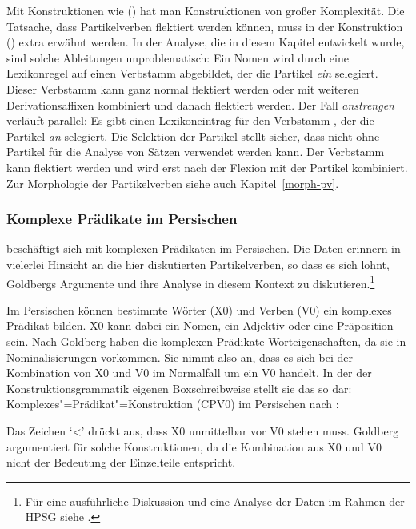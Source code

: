 Mit Konstruktionen wie () hat man Konstruktionen von großer Komplexität.
Die Tatsache, dass Partikelverben flektiert werden können, muss in der Konstruktion
() extra erwähnt werden. In der Analyse, die in diesem Kapitel entwickelt
wurde, sind solche Ableitungen unproblematisch: Ein Nomen wird durch eine
Lexikonregel auf einen Verbstamm abgebildet, der die Partikel \emph{ein} selegiert.
Dieser Verbstamm kann ganz normal flektiert werden oder mit weiteren Derivationsaffixen
kombiniert und danach flektiert werden. Der Fall \emph{anstrengen} verläuft parallel:
Es gibt einen Lexikoneintrag für den Verbstamm , der die Partikel \emph{an}
selegiert. Die Selektion der Partikel stellt sicher, dass  nicht ohne Partikel für die
Analyse von Sätzen verwendet werden kann. Der Verbstamm kann flektiert werden
und wird erst nach der Flexion mit der Partikel kombiniert.
Zur Morphologie der Partikelverben siehe auch Kapitel~\ref{morph-pv}.
%
%
%


\subsubsection{Komplexe Prädikate im Persischen}
\label{sec-cp-persisch}

\citet{Goldberg2003a} beschäftigt sich mit komplexen Prädikaten im Persischen.
Die Daten erinnern in vielerlei Hinsicht an die hier diskutierten Partikelverben, so dass
es sich lohnt, Goldbergs Argumente und ihre Analyse in diesem Kontext zu diskutieren.\footnote{
  Für eine ausführliche Diskussion und eine Analyse der Daten im Rahmen der HPSG siehe .
}

Im Persischen können bestimmte Wörter (X0) und Verben (V0) ein komplexes Prädikat bilden.
X0 kann dabei ein Nomen, ein Adjektiv oder eine Präposition sein. Nach Goldberg haben die
komplexen Prädikate Worteigenschaften, da sie in Nominalisierungen vorkommen. Sie nimmt also an,
dass es sich bei der Kombination von X0 und V0 im Normalfall um ein V0 handelt. In der
der Konstruktionsgrammatik eigenen Boxschreibweise stellt sie das so dar:
\eas
Komplexes"=Prädikat"=Konstruktion (CPV0) im Persischen nach :\\
\zs
Das Zeichen `<' drückt aus, dass X0 unmittelbar vor V0 stehen muss. Goldberg argumentiert
für solche Konstruktionen, da die Kombination aus X0 und V0 nicht der Bedeutung der
Einzelteile entspricht.

